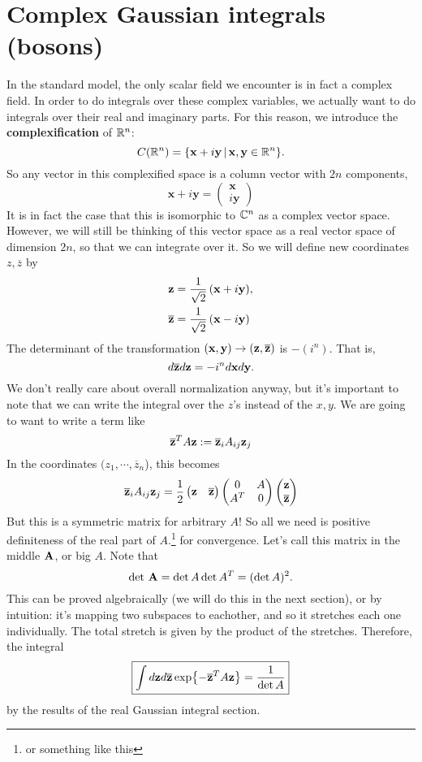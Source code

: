 \documentclass[main.tex]{subfiles}
\begin{document}
\section{Complex Gaussian integrals (bosons)}
In the standard model, the only scalar field we encounter is in fact a complex field. In order to do integrals over these complex variables, we actually want to do integrals over their real and imaginary parts. For this reason, we introduce the \textbf{complexification} of $\mathbb{R}^n$:
\[
C(\mathbb{R}^n) = \{\mathbf{x} + i\mathbf{y} \, \vert \, \mathbf{x},\mathbf{y} \in \mathbb{R}^n \}.
\]
So any vector in this complexified space is a column vector with $2n$ components,
\[
\mathbf{x} + i\mathbf{y} = \begin{pmatrix}
\mathbf{x} \\
i\mathbf{y}
\end{pmatrix}
\]
It is in fact the case that this is isomorphic to $\mathbb{C}^n$ as a complex vector space. However, we will still be thinking of this vector space as a real vector space of dimension $2n$, so that we can integrate over it. So we will define new coordinates $z,\overline{z}$ by
\begin{align*}
\mathbf{z} = \frac{1}{\sqrt{2}} \left( \mathbf{x} + i\mathbf{y} \right) &, \\
\overline{\mathbf{z}} = \frac{1}{\sqrt{2}} \left(\mathbf{x} -i \mathbf{y} \right)&
\end{align*}
The determinant of the transformation $(\mathbf{x},\mathbf{y}) \to (\mathbf{z},\overline{\mathbf{z}})$ is $-(i^n)$. That is,
\[
d\overline{\mathbf{z}} d\mathbf{z} = - i^n d\mathbf{x} d\mathbf{y}.
\]
We don't really care about overall normalization anyway, but it's important to note that we can write the integral over the $z$'s instead of the $x,y$.
We are going to want to write a term like
\[
\overline{\mathbf{z}}^T A \mathbf{z} := \overline{\mathbf{z}}_i A_{ij} \mathbf{z}_j
\]
In the coordinates $(z_1,\cdots,\overline{z}_n$), this becomes
\[
\overline{\mathbf{z}}_i A_{ij} \mathbf{z}_j = \frac{1}{2}
\begin{pmatrix} 
\mathbf{z} & \overline{\mathbf{z}}
\end{pmatrix}
\begin{pmatrix}
0 & A \\
A^T & 0
\end{pmatrix}
\begin{pmatrix}
\mathbf{z}\\ 
\overline{\mathbf{z}}
\end{pmatrix}
\]
But this is a symmetric matrix for arbitrary $A$! So all we need is positive definiteness of the real part of $A$.\footnote{or something like this} for convergence. Let's call this matrix in the middle $\mathbf{A}$, or big $A$. Note that 
\[
\det \, \mathbf{A} = \det A \det A^T = (\det A)^2.
\]
This can be proved algebraically (we will do this in the next section), or by intuition: it's mapping two subspaces to eachother, and so it stretches each one individually. The total stretch is given by the product of the stretches. Therefore, the integral
\begin{equation} \label{eq:bosongauss}
\boxed{\int d\mathbf{z} d\overline{\mathbf{z}} \exp{-\overline{\mathbf{z}}^T A \mathbf{z}} = \frac{1}{\det A}}
\end{equation}
by the results of the real Gaussian integral section.
\end{document}
